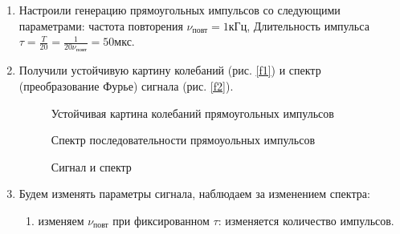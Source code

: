 \documentclass[a4paper,12pt]{article} %
\begin{document}
\begin{enumerate}
    \item Настроили генерацию прямоугольных импульсов со следующими параметрами: частота повторения $\nu_{\text{повт}} = 1 \text{кГц}$, Длительность импульса $\tau = \frac{T}{20} = \frac{1}{20\nu_{\text{повт}}} = 50 \text{мкс}$.
    \item Получили устойчивую картину колебаний (рис. \ref{f1}) и спектр (преобразование Фурье) сигнала (рис. \ref{f2}).

    \begin{figure}[h]
        \begin{minipage}[h]{0.5\linewidth}
    	\caption{Устойчивая картина колебаний прямоугольных импульсов}
            \label{f1}
        \end{minipage}
        \begin{minipage}[h]{0.5\linewidth}
    	\caption{Спектр последовательности прямоуольных импульсов}
            \label{f2}
        \end{minipage}
        \begin{minipage}[h]{0.5\linewidth}
    	\caption{Сигнал и спектр}
            \label{f3}
        \end{minipage}
    \end{figure}

    \item Будем изменять параметры сигнала, наблюдаем за изменением спектра:
    \begin{enumerate}
        \item изменяем $\nu_{\text{повт}}$ при фиксированном $\tau$: изменяется количество импульсов.


\end{enumerate}
\end{enumerate}
\end{document}
